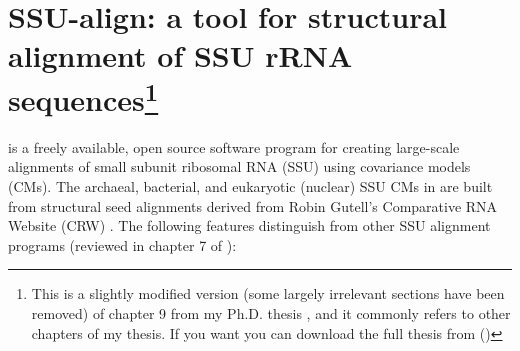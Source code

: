 \section{SSU-align: a tool for structural alignment of SSU
  rRNA sequences\protect\footnote{This is a slightly modified version
  (some largely irrelevant sections have been removed) 
  of chapter 9 from my Ph.D. thesis \cite{Nawrocki09b}, and it commonly refers to other
  chapters of my thesis. If you want you can download the full thesis from 
  ()}}
\label{section:chap9}

 is a freely available, open source software program
for creating large-scale alignments of small subunit ribosomal RNA
(SSU) using covariance models (CMs). The archaeal, bacterial,
and eukaryotic (nuclear) 
SSU CMs in  are built from structural seed alignments derived from
Robin Gutell's Comparative RNA Website (CRW) \cite{CannoneGutell02}.
The following features distinguish  from other
SSU alignment programs (reviewed in chapter 7 of \cite{Nawrocki09b}):

